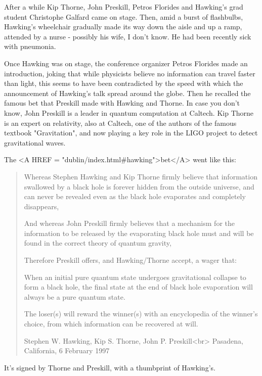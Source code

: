 After a while Kip Thorne, John Preskill, Petros Florides and Hawking's
grad student Christophe Galfard came on stage.  Then, amid a burst of 
flashbulbs, Hawking's wheelchair gradually made its way down the aisle 
and up a ramp, attended by a nurse - possibly his wife, I don't know.  
He had been recently sick with pneumonia.

Once Hawking was on stage, the conference organizer Petros Florides made 
an introduction, joking that while physicists believe no information can
travel faster than light, this seems to have been contradicted by the 
speed with which the announcement of Hawking's talk spread around the globe.  
Then he recalled the famous bet that Preskill made with Hawking and
Thorne.  In case you don't know, John Preskill is a leader in quantum
computation at Caltech.   Kip Thorne is an expert on relativity, also 
at Caltech, one of the authors of the famous textbook "Gravitation", 
and now playing a key role in the LIGO project to detect gravitational 
waves.  

The <A HREF = "dublin/index.html#hawking">bet</A> went like this:

\begin{quote}
     Whereas Stephen Hawking and Kip Thorne firmly believe that 
     information swallowed by a black hole is forever hidden from 
     the outside universe, and can never be revealed even as the 
     black hole evaporates and completely disappears,

     And whereas John Preskill firmly believes that a mechanism 
     for the information to be released by the evaporating black 
     hole must and will be found in the correct theory of quantum 
     gravity,

     Therefore Preskill offers, and Hawking/Thorne accept, a wager that:

     When an initial pure quantum state undergoes gravitational collapse 
     to form a black hole, the final state at the end of black hole 
     evaporation will always be a pure quantum state.

     The loser(s) will reward the winner(s) with an encyclopedia of the 
     winner's choice, from which information can be recovered at will.

     Stephen W. Hawking, Kip S. Thorne, John P. Preskill<br>
     Pasadena, California, 6 February 1997 
\end{quote}
    

It's signed by Thorne and Preskill, with a thumbprint of Hawking's.

